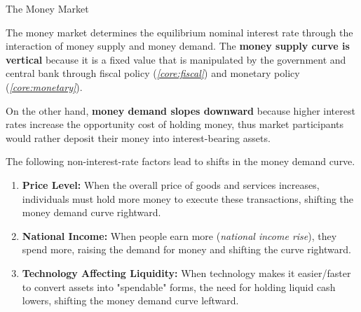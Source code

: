 \documentclass[10pt]{article}
\begin{document}
    \begin{core}[label=core:mmarket]{The Money Market}

      The money market determines the equilibrium nominal interest rate through the interaction of money supply and money demand. The \textbf{money supply curve is vertical} because it is a fixed value that is manipulated by the government and central bank through fiscal policy (\textit{\autoref{core:fiscal}}) and monetary policy (\textit{\autoref{core:monetary}}).

      On the other hand, \textbf{money demand slopes downward} because higher interest rates increase the opportunity cost of holding money, thus market participants would rather deposit their money into interest-bearing assets.


      The following non-interest-rate factors lead to shifts in the money demand curve.

      \begin{enumerate}

        \item \textbf{Price Level:} When the overall price of goods and services increases, individuals must hold more money to execute these transactions, shifting the money demand curve rightward.

        \item \textbf{National Income:} When people earn more (\textit{national income rise}), they spend more, raising the demand for money and shifting the curve rightward.

        \item \textbf{Technology Affecting Liquidity:} When technology makes it easier/faster to convert assets into "spendable" forms, the need for holding liquid cash lowers, shifting the money demand curve leftward.

      \end{enumerate}

    \end{core}
\end{document}
